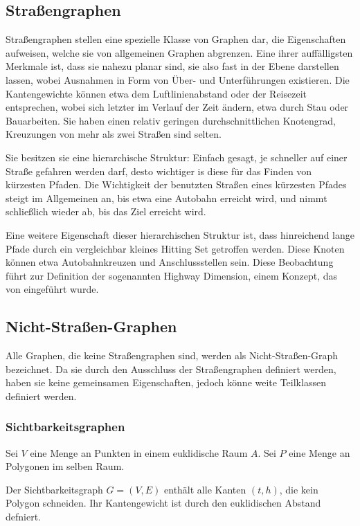 \subsection{Straßengraphen}\label{graphs:strassengraphen}

Straßengraphen stellen eine spezielle Klasse von Graphen dar, die  Eigenschaften aufweisen, welche sie von allgemeinen Graphen abgrenzen.
Eine ihrer auffälligsten Merkmale ist, dass sie nahezu planar sind, sie also fast in der Ebene darstellen lassen, wobei Ausnahmen in Form von Über- und Unterführungen existieren.
Die Kantengewichte können etwa dem Luftlinienabstand oder der Reisezeit entsprechen, wobei sich letzter im Verlauf der Zeit ändern, etwa durch Stau oder Bauarbeiten.
Sie haben einen relativ geringen durchschnittlichen Knotengrad, Kreuzungen von mehr als zwei Straßen sind selten.

Sie besitzen sie eine hierarchische Struktur: Einfach gesagt, je schneller auf einer Straße gefahren werden darf, desto wichtiger is diese für das Finden von kürzesten Pfaden.
Die Wichtigkeit der benutzten Straßen eines kürzesten Pfades steigt im Allgemeinen an, bis etwa eine Autobahn erreicht wird, und nimmt schließlich wieder ab, bis das Ziel erreicht wird.

Eine weitere Eigenschaft dieser hierarchischen Struktur ist, dass hinreichend lange Pfade durch ein vergleichbar kleines Hitting Set getroffen werden.
Diese Knoten können etwa Autobahnkreuzen und Anschlussstellen sein.
Diese Beobachtung führt zur Definition der sogenannten Highway Dimension, einem Konzept, das von \cite{abraham2010highway} eingeführt wurde.

\subsection{Nicht-Straßen-Graphen}

Alle Graphen, die keine Straßengraphen sind, werden als Nicht-Straßen-Graph bezeichnet.
Da sie durch den Ausschluss der Straßengraphen definiert werden, haben sie keine gemeinsamen Eigenschaften, jedoch könne weite Teilklassen definiert werden.

\subsubsection{Sichtbarkeitsgraphen}


\begin{definition}[Sichtbarkeitsgraph]
    Sei $V$ eine Menge an Punkten in einem euklidische Raum $A$. Sei $P$ eine Menge an Polygonen im selben Raum.

    Der Sichtbarkeitsgraph $G = (V, E)$ enthält alle Kanten $(t, h)$, die kein Polygon schneiden.
    Ihr Kantengewicht ist durch den euklidischen Abstand defniert.
\end{definition}



